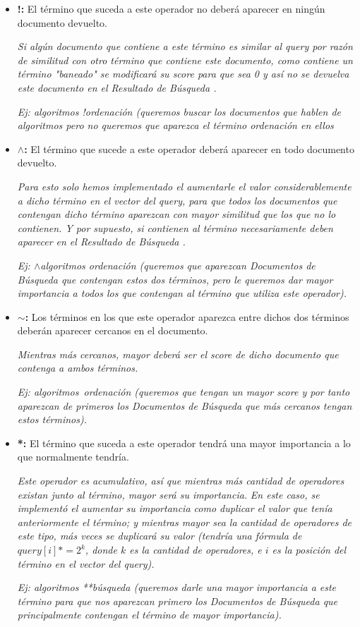 \documentclass[12pt]{article}
\newcommand{\SearchItems}{\emph{Documentos de Búsqueda} }
\newcommand{\SearchResult}{\emph{Resultado de Búsqueda} }
\begin{document}
\begin{itemize}
	\item \textbf{!:} El término que suceda a este operador no deberá aparecer en ningún documento devuelto.
	
	\emph{Si algún documento que contiene a este término es similar al query por razón de similitud con otro término que contiene este documento, como contiene un término "baneado" se modificará su score para que sea 0 y así no se devuelva este documento en el \SearchResult.}
	
	\emph{Ej: algoritmos !ordenación (queremos buscar los documentos que hablen de algoritmos pero no queremos que aparezca el término ordenación en ellos}
	
	\item \textbf{$\wedge$:} El término que sucede a este operador deberá aparecer en todo documento devuelto.
	
	\emph{Para esto solo hemos implementado el aumentarle el valor considerablemente a dicho término en el vector del query, para que todos los documentos que contengan dicho término aparezcan con mayor similitud que los que no lo contienen. Y por supuesto, si contienen al término necesariamente deben aparecer en el \SearchResult.}
	
	\emph{Ej: $\wedge$algoritmos ordenación (queremos que aparezcan \SearchItems que contengan estos dos términos, pero le queremos dar mayor importancia a todos los que contengan al término que utiliza este operador).}
	
	\item \textbf{$\sim$:} Los términos en los que este operador aparezca entre dichos dos términos deberán aparecer cercanos en el documento.
	
	\emph{Mientras más cercanos, mayor deberá ser el score de dicho documento que contenga a ambos términos.}
	
	\emph{Ej: algoritmos~ordenación (queremos que tengan un mayor score y por tanto aparezcan de primeros los \SearchItems que más cercanos tengan estos términos).}
	
	\item \textbf{*:} El término que suceda a este operador tendrá una mayor importancia a lo que normalmente tendría.
	
	\emph{Este operador es acumulativo, así que mientras más cantidad de operadores existan junto al término, mayor será su importancia.}
	\emph{En este caso, se implementó el aumentar su importancia como duplicar el valor que tenía anteriormente el término; y mientras mayor sea la cantidad de operadores de este tipo, más veces se duplicará su valor (tendría una fórmula de $query[i]*=2^k$, donde $k$ es la cantidad de operadores, e $i$ es la posición del término en el vector del query).}
	
	\emph{Ej: algoritmos **búsqueda (queremos darle una mayor importancia a este término para que nos aparezcan primero los \SearchItems que principalmente contengan el término de mayor importancia).}
\end{itemize}
\end{document}
